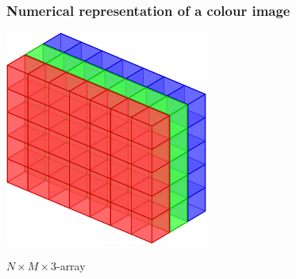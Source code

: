 \documentclass{beamer}
\begin{document}
\frame
{
 \frametitle{Numerical representation of a colour image}

 \begin{center}
  \includegraphics[width=0.5\textwidth]{rgbarray}
 
  \vspace{0.3truecm}
  $N\times M\times3$-array
 \end{center}
}
\end{document}
